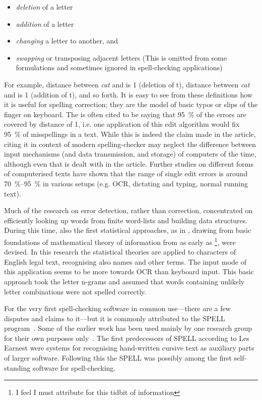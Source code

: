 \documentclass[officiallayout]{unihelcompling}
\newcommand\misspelt{\bgroup\markoverwith
{\textcolor{red}{\lower3.5pt\hbox{\sixly \char58}}}\ULon}
\begin{document}
\begin{itemize}
    \item \emph{deletion} of a letter
    \item \emph{addition} of a letter
    \item \emph{changing} a letter to another, and
    \item \emph{swapping} or transposing adjacent letters
        (This is omitted from some formulations and sometimes ignored in
        spell-checking applications)
\end{itemize}

For example, distance between \emph{cat} and \misspelt{ca} is 1 (deletion of
t), distance between \emph{cat} and \misspelt{catt} is 1 (addition of t), and
so forth.  It is easy to see from these definitions how it is useful for
spelling correction; they are the model of basic typos or slips of the finger
on keyboard. The \citep{damerau1964technique} is often cited to be saying that
95~\% of the errors are covered by distance of 1, i.e. one application of this
edit algorithm would fix 95~\% of misspellings in a text. While this is indeed
the claim made in the article, citing it in context of modern spelling-checker
may neglect the difference between input mechanisms (and data transmission, and
storage) of computers of the time, although even that is dealt with in the
article. Further studies on different forms of computerised texts have shown
that the range of single edit errors is around 70~\%--95~\% in various setups
(e.g. OCR, dictating and typing, normal running text).

Much of the research on error detection, rather than correction, concentrated
on efficiently looking up words from finite word-lists and building data
structures. During this time, also the first statistical approaches, as in
\citet{raviv1967decision}, drawing from basic foundations of mathematical
theory of information from as early as
\citet{shannon1948mathematical}\footnote{I feel I must attribute
\citet{liberman2012noisily} for this tidbit of information}, were devised. In
this research the statistical theories are applied to characters of English
legal text, recognising also names and other terms. The input mode of this
application seems to be more towards OCR than keyboard input. This basic
approach took the letter n-grams and assumed that words containing unlikely
letter combinations were not spelled correctly.

For the very first spell-checking software in common use---there are a few
disputes and claims to it---but it is commonly attributed to the SPELL
program~\citep{gorin1971spell}.  Some of the earlier work has been used mainly
by one research group for their own purposes 
only~\citep{earnest2011first,earnest2012first}. The first predecessors of SPELL
according to Les Earnest were systems for recognising hand-written cursive text
as auxiliary parts of larger software. Following this the SPELL was possibly
among the first self-standing software for spell-checking.
\end{document}
